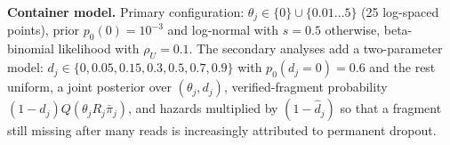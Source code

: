 \begin{table}[!t]
\vspace{2pt}
\parbox{\textwidth}{\footnotesize \textbf{Container model.}  Primary configuration: $\theta_j\in\{0\}\cup\{0.01\dots5\}$
(25 log-spaced points), prior $p_0(0)=10^{-3}$ and log-normal with $s{=}0.5$ otherwise, beta-binomial
likelihood with $\rho_U{=}0.1$.  The secondary analyses add a two-parameter model: $d_j\in\{0,0.05,0.15,0.3,0.5,0.7,0.9\}$
with $p_0(d_j{=}0)=0.6$ and the rest uniform, a joint posterior over $(\theta_j,d_j)$, verified-fragment
probability $(1-d_j)Q(\theta_jR_j\bar\pi_j)$, and hazards multiplied by $(1-\hat d_j)$ so that a fragment
still missing after many reads is increasingly attributed to permanent dropout.}
\end{table}
